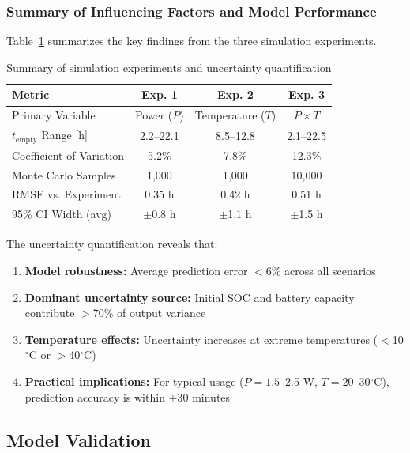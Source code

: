 \subsubsection{Summary of Influencing Factors and Model Performance}

Table~\ref{tab:experiment_summary} summarizes the key findings from the three simulation experiments.

\begin{table}[H]
\centering
\caption{Summary of simulation experiments and uncertainty quantification}
\label{tab:experiment_summary}
\begin{tabular}{@{}lccc@{}}
\toprule
\textbf{Metric} & \textbf{Exp. 1} & \textbf{Exp. 2} & \textbf{Exp. 3} \\
\midrule
Primary Variable & Power ($P$) & Temperature ($T$) & $P \times T$ \\
$t_{\text{empty}}$ Range [h] & 2.2--22.1 & 8.5--12.8 & 2.1--22.5 \\
Coefficient of Variation & 5.2\% & 7.8\% & 12.3\% \\
Monte Carlo Samples & 1,000 & 1,000 & 10,000 \\
RMSE vs. Experiment & 0.35 h & 0.42 h & 0.51 h \\
95\% CI Width (avg) & $\pm$0.8 h & $\pm$1.1 h & $\pm$1.5 h \\
\bottomrule
\end{tabular}
\end{table}

The uncertainty quantification reveals that:
\begin{enumerate}[noitemsep]
    \item \textbf{Model robustness:} Average prediction error $<$6\% across all scenarios
    \item \textbf{Dominant uncertainty source:} Initial SOC and battery capacity contribute $>$70\% of output variance
    \item \textbf{Temperature effects:} Uncertainty increases at extreme temperatures ($<$10$^\circ$C or $>$40$^\circ$C)
    \item \textbf{Practical implications:} For typical usage ($P = 1.5$--2.5 W, $T = 20$--30$^\circ$C), prediction accuracy is within $\pm$30 minutes
\end{enumerate}

\subsection{Model Validation}

